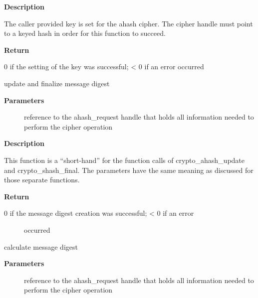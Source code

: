 \documentclass[a4paper,8pt,english]{sphinxmanual}
\begin{document}
\textbf{Description}

The caller provided key is set for the ahash cipher. The cipher
handle must point to a keyed hash in order for this function to succeed.

\textbf{Return}

0 if the setting of the key was successful; \textless{} 0 if an error occurred

\begin{fulllineitems}
\label{crypto/api-digest:c.crypto_ahash_finup}
update and finalize message digest

\end{fulllineitems}


\textbf{Parameters}
\begin{description}
\item[{}] \leavevmode
reference to the ahash\_request handle that holds all information
needed to perform the cipher operation

\end{description}

\textbf{Description}

This function is a ``short-hand'' for the function calls of
crypto\_ahash\_update and crypto\_shash\_final. The parameters have the same
meaning as discussed for those separate functions.

\textbf{Return}
\begin{description}
\item[{0 if the message digest creation was successful; \textless{} 0 if an error}] \leavevmode
occurred

\end{description}

\begin{fulllineitems}
\label{crypto/api-digest:c.crypto_ahash_final}
calculate message digest

\end{fulllineitems}


\textbf{Parameters}
\begin{description}
\item[{}] \leavevmode
reference to the ahash\_request handle that holds all information
needed to perform the cipher operation

\end{description}
\end{document}
